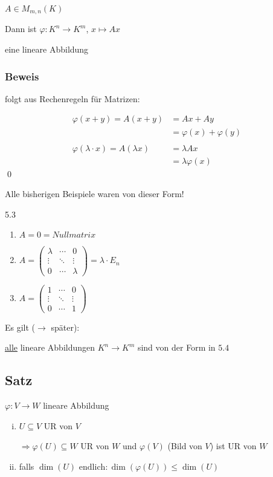 $A \in M_{m,n}(K)$

Dann ist $\varphi: K^n \rightarrow K^m$, $x \mapsto Ax$

eine lineare Abbildung \bigskip

\subsubsection*{Beweis}

folgt aus Rechenregeln für Matrizen:

\begin{align*}
\varphi(x+y) = A(x+y) &= Ax + Ay\\
&= \varphi(x) + \varphi(y)\\
\\
\varphi(\lambda \cdot x) = A(\lambda x) &= \lambda A x\\
&= \lambda \varphi(x)
\end{align*}
\qed

Alle bisherigen Beispiele waren von dieser Form!

5.3
\begin{enumerate}
\item $A = 0 = Nullmatrix$

\item $A =
\begin{pmatrix}
\lambda & \cdots & 0\\
\vdots & \ddots & \vdots\\
0 & \cdots & \lambda
\end{pmatrix} =
\lambda \cdot E_n
$
\medskip

\item $A =
\begin{pmatrix}
1 & \cdots & 0\\
\vdots & \ddots & \vdots\\
0 & \cdots & 1
\end{pmatrix}
$ 
\end{enumerate}

Es gilt ($\rightarrow$ später):

\underline{alle} lineare Abbildungen $K^n \rightarrow K^m$ sind von der Form in $5.4$

\subsection{Satz}

$\varphi: V \rightarrow W$ lineare Abbildung

\begin{enumerate}[(i)]
	\item
	$U \subseteq V$ UR von $V$
	
	$\Rightarrow \varphi(U) \subseteq W$ UR von $W$ und $\varphi(V)$ (Bild von $V$) ist UR von $W$
	
	\item
	falls $\dim(U) {\text{ endlich}}: \dim(\varphi(U)) \leq \dim(U)$
\end{enumerate}

